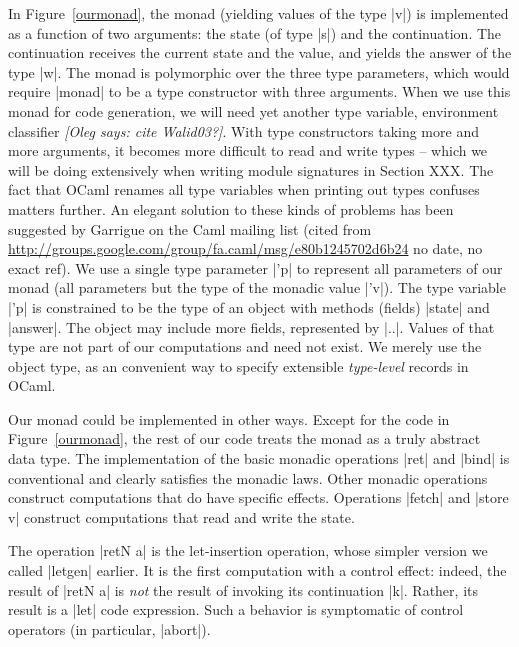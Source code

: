 \documentclass[draft]{elsart}
\newcommand{\oleg}[1]{{\it [Oleg says: #1]}}
\begin{document}
In Figure~\ref{ourmonad}, the monad (yielding values of the type |v|)
is implemented as a function of two
arguments: the state (of type |s|) and the continuation. The
continuation receives the current state and the value, and
yields the answer of the type |w|.  The monad is polymorphic over the
three type parameters, which would require |monad| to be a type
constructor with three arguments. When we use this monad for code
generation, we will need yet another type variable, environment
classifier \oleg{cite Walid03?}. With type constructors taking more
and more arguments, it becomes more difficult to read and write
types -- which we will be doing extensively when writing module
signatures in Section XXX. The fact that OCaml renames all type
variables when printing out types confuses matters further. An elegant
solution to these kinds of problems has been suggested by 
Garrigue on the Caml mailing list 
(cited from
\url{http://groups.google.com/group/fa.caml/msg/e80b1245702d6b24}
no date, no exact ref). We use a single type parameter |'p| to
represent all parameters of our monad (all parameters but the type of
the monadic value |'v|). The type variable |'p| is constrained to be
the type of an object with methods (fields) |state| and |answer|. The
object may include more fields, represented by |..|. Values of that
type are not part of our computations and need not exist. We merely
use the object type, as an convenient way to specify extensible
\emph{type-level} records in OCaml.     

Our monad could be implemented in other ways. Except for the code in
Figure~\ref{ourmonad}, the rest of our code treats the monad as a
truly abstract data type. The implementation of the basic monadic
operations |ret| and |bind| is conventional and clearly satisfies the
monadic laws. Other monadic operations construct computations that do
have specific effects.  Operations |fetch| and |store v| construct
computations that read and write the state.

The operation |retN a| is the let-insertion operation, whose simpler
version we called |letgen| earlier. It is the first computation with
a control effect: indeed, the result of |retN a| is \emph{not} the
result of invoking its continuation |k|. Rather, its result is a |let|
code expression. Such a behavior is symptomatic of control operators
(in particular, |abort|).
\end{document}
